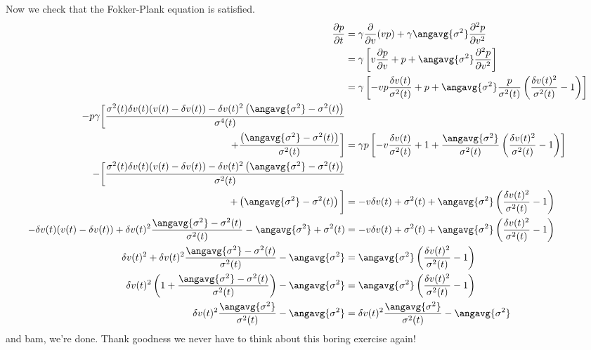 Now we check that the Fokker-Plank equation is satisfied.
\begin{align*}
  \frac{\partial p}{\partial t} &= \gamma \frac{\partial}{\partial v}(vp) + \gamma \angavg{\sigma^2} \frac{\partial^2 p}{\partial v^2} \\
  &= \gamma \left[
    v \frac{\partial p}{\partial v} + p + \angavg{\sigma^2} \frac{\partial^2 p}{\partial v^2}
    \right] \\
  &= \gamma \left[
    -v p \frac{\delta v(t)}{\sigma^2(t)} + p + \angavg{\sigma^2} \frac{p}{\sigma^2(t)} \left( \frac{\delta v(t)^2}{\sigma^2(t)} -1 \right)
  \right] \\
  -p \gamma \bigg[
    \frac{\sigma^2(t) \delta v(t) (v(t) - \delta v(t)) - \delta v(t)^2 \left(
      \angavg{\sigma^2} - \sigma^2(t) \right)}{\sigma^4(t)} \\
  + \frac{\left( \angavg{\sigma^2} - \sigma^2(t) \right)}{\sigma^2(t)}
  \bigg]
  &= \gamma p \left[
    -v \frac{\delta v(t)}{\sigma^2(t)} + 1 + \frac{\angavg{\sigma^2}}{\sigma^2(t)} \left( \frac{\delta v(t)^2}{\sigma^2(t)} -1 \right)
  \right] \\
  -\bigg[
    \frac{\sigma^2(t) \delta v(t) (v(t) - \delta v(t)) - \delta v(t)^2 \left(
      \angavg{\sigma^2} - \sigma^2(t) \right)}{\sigma^2(t)} \\
  + \left( \angavg{\sigma^2} - \sigma^2(t) \right)
  \bigg]
  &=
  -v \delta v(t) + \sigma^2(t) + \angavg{\sigma^2} \left( \frac{\delta v(t)^2}{\sigma^2(t)} -1 \right) \\
  - \delta v(t) (v(t) - \delta v(t))
  + \delta v(t)^2 \frac{\angavg{\sigma^2} - \sigma^2(t)}{\sigma^2(t)}
  - \angavg{\sigma^2} + \sigma^2(t)
  &=
  -v \delta v(t) + \sigma^2(t) + \angavg{\sigma^2} \left( \frac{\delta v(t)^2}{\sigma^2(t)} -1 \right) \\
  \delta v(t)^2
  + \delta v(t)^2 \frac{\angavg{\sigma^2} - \sigma^2(t)}{\sigma^2(t)}
  - \angavg{\sigma^2}
  &=
  \angavg{\sigma^2} \left( \frac{\delta v(t)^2}{\sigma^2(t)} -1 \right) \\
  \delta v(t)^2 \left( 1 + \frac{\angavg{\sigma^2} - \sigma^2(t)}{\sigma^2(t)} \right)
  - \angavg{\sigma^2}
  &=
  \angavg{\sigma^2} \left( \frac{\delta v(t)^2}{\sigma^2(t)} -1 \right) \\
  \delta v(t)^2 \frac{\angavg{\sigma^2}}{\sigma^2(t)} - \angavg{\sigma^2}
  &=
  \delta v(t)^2 \frac{\angavg{\sigma^2}}{\sigma^2(t)} - \angavg{\sigma^2}
\end{align*}
and bam, we're done.
Thank goodness we never have to think about this boring exercise again!
